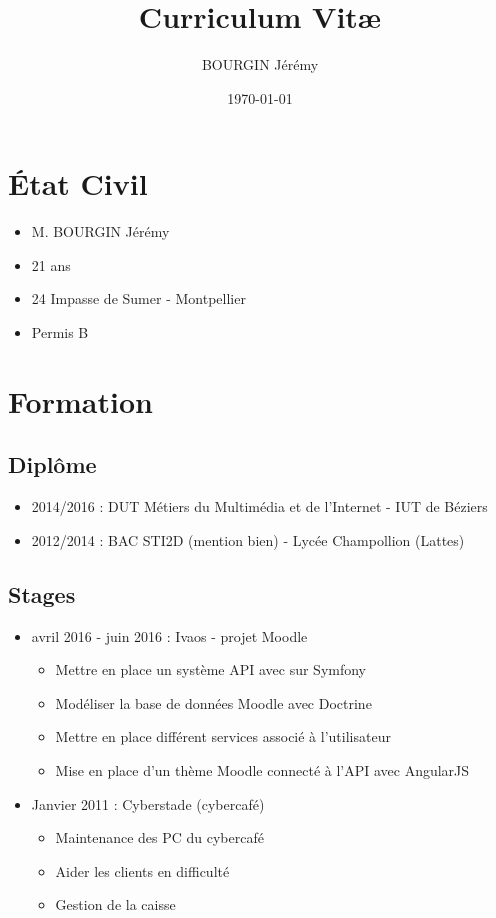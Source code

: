 \documentclass[a4paper]{article}
\title{Curriculum Vit\ae}
\author{BOURGIN Jérémy}
\date{\today}
\begin{document}
\maketitle

\section{\'Etat Civil}
    \begin{itemize}
        \item M. BOURGIN Jérémy
        \item 21 ans
        \item 24 Impasse de Sumer - Montpellier
        \item Permis B
    \end{itemize}

\section{Formation}
    \subsection{Diplôme}
        \begin{itemize}
            \item 2014/2016 : DUT Métiers du Multimédia et de l'Internet - IUT de Béziers
            \item 2012/2014 : BAC STI2D (mention bien) - Lycée Champollion (Lattes)
        \end{itemize}
    \subsection{Stages}
        \begin{itemize}
            \item avril 2016 - juin 2016 : Ivaos - projet Moodle
            \begin{itemize}
                \item Mettre en place un système API avec sur Symfony
                \item Modéliser la base de données Moodle avec Doctrine
                \item Mettre en place différent services associé à l'utilisateur
                \item Mise en place d'un thème Moodle connecté à l'API avec AngularJS
            \end{itemize}
        \end{itemize}
        \begin{itemize}
            \item Janvier 2011 : Cyberstade (cybercafé)
            \begin{itemize}
                \item Maintenance des PC du cybercafé
                \item Aider les clients en difficulté
                \item Gestion de la caisse
            \end{itemize}
        \end{itemize}
\end{document}
